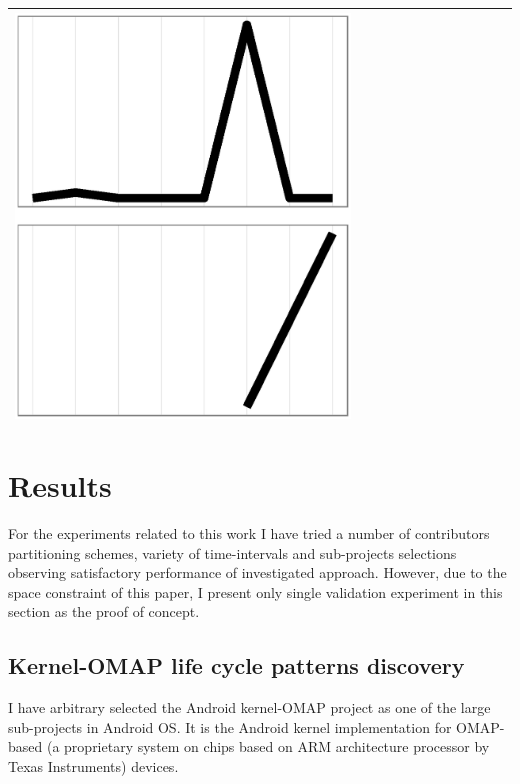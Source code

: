 \documentclass[conference]{IEEEtran}
\begin{document}
\begin{table}
\begin{tabular}{ | b{1.5cm} | c | c | c | c | c | c | c | c | c | c | c |}
 \includegraphics[scale=0.08]{figures/bbbc.ps} \\
  \hline
  \end{tabular}
\end{table}

\section{Results}
For the experiments related to this work I have tried a number of contributors 
partitioning schemes, variety of time-intervals and sub-projects selections observing
satisfactory performance of investigated approach. However, due to the space constraint 
of this paper, I present only single validation experiment in this section 
as the proof of concept.

\subsection{Kernel-OMAP life cycle patterns discovery}
I have arbitrary selected the Android kernel-OMAP project as one of the large sub-projects in Android OS. 
It is the Android kernel implementation for OMAP-based (a proprietary system on chips based on 
ARM architecture processor by Texas Instruments) devices.
\end{document}

